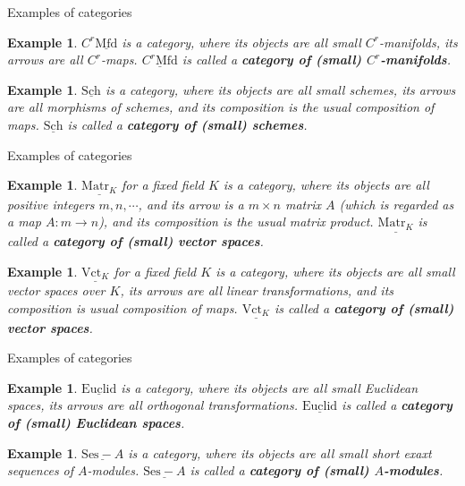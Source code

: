 \documentclass[dvipdfmx,10pt,notheorems]{beamer}
\newtheorem{example}[theorem]{Example}
\renewcommand{\#}{^\sharp}
\begin{document}
	\begin{frame}{Examples of categories}
			\begin{example}
			$C^r\underline{\mathrm{Mfd}}$ is a category, where its objects are all small $C^r$-manifolds,
			its arrows are all $C^r$-maps.
			$\underline{C^r\mathrm{Mfd}}$ is called a {\bf category of (small) $C^r$-manifolds}.
			\end{example}
			\begin{example}
			$\underline{\mathrm{Sch}}$ is a category, where its objects are all small schemes,
			its arrows are all morphisms of schemes,
			and its composition is the usual composition of maps.
			$\underline{\mathrm{Sch}}$ is called a {\bf category of (small) schemes}.
			\end{example}
	\end{frame}
	
	
	
	\begin{frame}{Examples of categories}
			\begin{example}
			$\underline{\mathrm{Matr}_K}$ for a fixed field $K$ is a category, where its objects are all positive integers $m,n,\cdots$,
			and 
			its arrow is a $m\times n$ matrix $A$ (which is regarded as a map $A:m\rightarrow n$),
			and its composition is the usual matrix product.
			$\underline{\mathrm{Matr}_K}$ is called a {\bf category of (small) vector spaces}.
			\end{example}
			\begin{example}
			$\underline{\mathrm{Vct}_K}$ for a fixed field $K$ is a category, where its objects are all small vector spaces over $K$,
			its arrows are all linear transformations,
			and its composition is usual composition of maps.
			$\underline{\mathrm{Vct}_K}$ is called a {\bf category of (small) vector spaces}.
			\end{example}
	\end{frame}



	\begin{frame}{Examples of categories}
			\begin{example}
			$\underline{\mathrm{Euclid}}$ is a category, where its objects are all small Euclidean spaces,
			its arrows are all orthogonal transformations.
			$\underline{\mathrm{Euclid}}$ is called a {\bf category of (small) Euclidean spaces}.
			\end{example}
			\begin{example}
			$\underline{\mathrm{Ses-}A}$ is a category, where its objects are all small short exaxt sequences of $A$-modules.
			$\underline{\mathrm{Ses-}A}$ is called a {\bf category of (small) $A$-modules}.
			\end{example}
	\end{frame}
	
\end{document}

